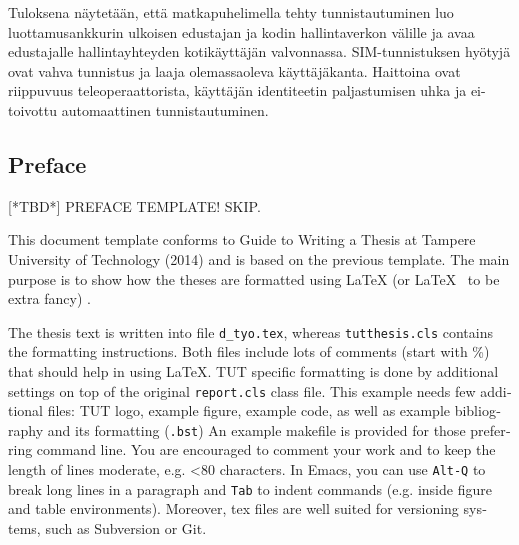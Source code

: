 \documentclass[12pt,a4paper,english]{tutthesis}
\begin{document}
\begin{otherlanguage}{finnish}
Tuloksena näytetään, että matkapuhelimella tehty tunnistautuminen luo 
luottamusankkurin ulkoisen edustajan ja kodin hallintaverkon välille ja 
avaa edustajalle hallintayhteyden kotikäyttäjän valvonnassa.
SIM-tunnistuksen hyötyjä ovat vahva tunnistus
 ja laaja olemassaoleva käyttäjäkanta. Haittoina ovat
 riippuvuus teleoperaattorista, käyttäjän identiteetin
paljastumisen uhka ja ei-toivottu automaattinen tunnistautuminen.
\end{otherlanguage}

\begin{otherlanguage}{english} %
\makeatother %

%
%
\chapter*{Preface}

[*TBD*]
PREFACE TEMPLATE! SKIP.

This document template conforms to Guide to Writing a Thesis at
Tampere University of Technology (2014) and is based on the previous
template. The main purpose is to show how the theses are formatted
using LaTeX (or \LaTeX ~ to be extra fancy) .


The thesis text is written into file \texttt{d\_tyo.tex}, whereas
\texttt{tutthesis.cls} contains the formatting instructions. Both
files include lots of comments (start with \%) that should help in
using LaTeX. TUT specific formatting is done by additional settings on
top of the original \texttt{report.cls} class file. This example needs
few additional files: TUT logo, example figure, example code, as well
as example bibliography and its formatting (\texttt{.bst}) An example
makefile is provided for those preferring command line. You are
encouraged to comment your work and to keep the length of lines
moderate, e.g. <80 characters. In Emacs, you can use \texttt{Alt-Q} to
break long lines in a paragraph and \texttt{Tab} to indent commands
(e.g. inside figure and table environments). Moreover, tex files are
well suited for versioning systems, such as Subversion or Git.  


\end{otherlanguage}
\end{document}

